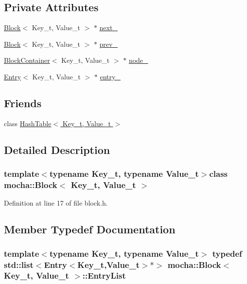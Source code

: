 \subsection*{Private Attributes}
\begin{DoxyCompactItemize}
\item 
\hyperlink{classmocha_1_1_block}{Block}$<$ Key\_\-t, Value\_\-t $>$ $\ast$ \hyperlink{classmocha_1_1_block_a8c506f64ed0ff2476b5e0dc2e5d53f8d}{next\_\-}
\item 
\hyperlink{classmocha_1_1_block}{Block}$<$ Key\_\-t, Value\_\-t $>$ $\ast$ \hyperlink{classmocha_1_1_block_ae8d39631c54d02454b942bc17304df98}{prev\_\-}
\item 
\hyperlink{structmocha_1_1_block_container}{BlockContainer}$<$ Key\_\-t, Value\_\-t $>$ $\ast$ \hyperlink{classmocha_1_1_block_a8293c90ec2083f03208cae2d88d69ea7}{node\_\-}
\item 
\hyperlink{classmocha_1_1_entry}{Entry}$<$ Key\_\-t, Value\_\-t $>$ $\ast$ \hyperlink{classmocha_1_1_block_ada95cd41b7f920efd5edf47140b9111b}{entry\_\-}
\end{DoxyCompactItemize}
\subsection*{Friends}
\begin{DoxyCompactItemize}
\item 
class \hyperlink{classmocha_1_1_block_a63ed0d853d9ea8144eafb8c114be45a6}{HashTable$<$ Key\_\-t, Value\_\-t $>$}
\end{DoxyCompactItemize}


\subsection{Detailed Description}
\subsubsection*{template$<$typename Key\_\-t, typename Value\_\-t$>$class mocha::Block$<$ Key\_\-t, Value\_\-t $>$}



Definition at line 17 of file block.h.



\subsection{Member Typedef Documentation}
\hypertarget{classmocha_1_1_block_a021e0317e479cd9af8dc345d382bf675}{
\subsubsection[{EntryList}]{\setlength{\rightskip}{0pt plus 5cm}template$<$typename Key\_\-t, typename Value\_\-t$>$ typedef std::list$<${\bf Entry}$<$Key\_\-t,Value\_\-t$>$$\ast$$>$ {\bf mocha::Block}$<$ Key\_\-t, Value\_\-t $>$::{\bf EntryList}}}
\label{classmocha_1_1_block_a021e0317e479cd9af8dc345d382bf675}


